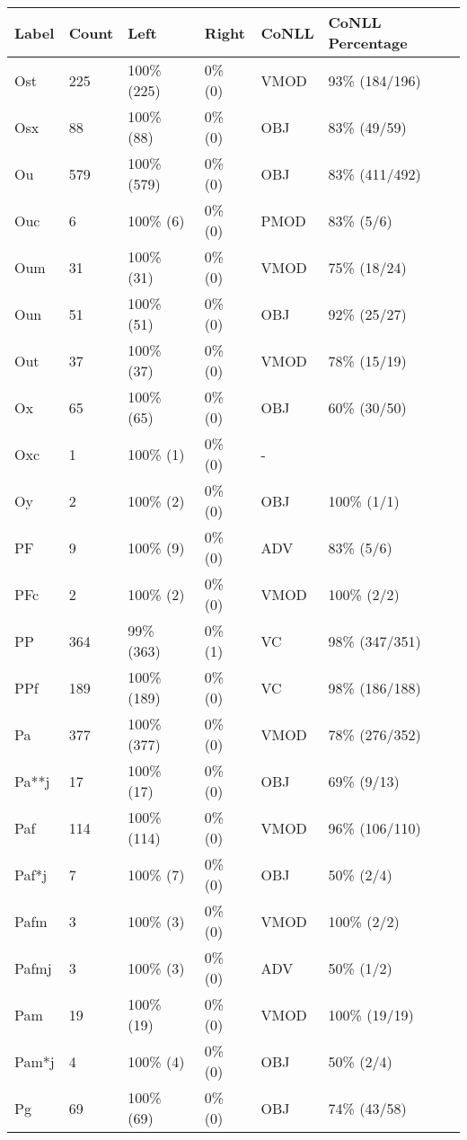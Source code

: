 \begin{figure*}
\begin{tabular}{|l|l|l|l||l|l|}
\hline
Label & Count & Left & Right & CoNLL & CoNLL Percentage\\ 
\hline
 Ost & 225 & 100\% (225) & 0\% (0) & VMOD & 93\% (184/196) \\ 
\hline
 Osx & 88 & 100\% (88) & 0\% (0) & OBJ & 83\% (49/59) \\ 
\hline
 Ou & 579 & 100\% (579) & 0\% (0) & OBJ & 83\% (411/492) \\ 
\hline
 Ouc & 6 & 100\% (6) & 0\% (0) & PMOD & 83\% (5/6) \\ 
\hline
 Oum & 31 & 100\% (31) & 0\% (0) & VMOD & 75\% (18/24) \\ 
\hline
 Oun & 51 & 100\% (51) & 0\% (0) & OBJ & 92\% (25/27) \\ 
\hline
 Out & 37 & 100\% (37) & 0\% (0) & VMOD & 78\% (15/19) \\ 
\hline
 Ox & 65 & 100\% (65) & 0\% (0) & OBJ & 60\% (30/50) \\ 
\hline
 Oxc & 1 & 100\% (1) & 0\% (0) & - &  \\ 
\hline
 Oy & 2 & 100\% (2) & 0\% (0) & OBJ & 100\% (1/1) \\ 
\hline
 PF & 9 & 100\% (9) & 0\% (0) & ADV & 83\% (5/6) \\ 
\hline
 PFc & 2 & 100\% (2) & 0\% (0) & VMOD & 100\% (2/2) \\ 
\hline
 PP & 364 & 99\% (363) & 0\% (1) & VC & 98\% (347/351) \\ 
\hline
 PPf & 189 & 100\% (189) & 0\% (0) & VC & 98\% (186/188) \\ 
\hline
 Pa & 377 & 100\% (377) & 0\% (0) & VMOD & 78\% (276/352) \\ 
\hline
 Pa**j & 17 & 100\% (17) & 0\% (0) & OBJ & 69\% (9/13) \\ 
\hline
 Paf & 114 & 100\% (114) & 0\% (0) & VMOD & 96\% (106/110) \\ 
\hline
 Paf*j & 7 & 100\% (7) & 0\% (0) & OBJ & 50\% (2/4) \\ 
\hline
 Pafm & 3 & 100\% (3) & 0\% (0) & VMOD & 100\% (2/2) \\ 
\hline
 Pafmj & 3 & 100\% (3) & 0\% (0) & ADV & 50\% (1/2) \\ 
\hline
 Pam & 19 & 100\% (19) & 0\% (0) & VMOD & 100\% (19/19) \\ 
\hline
 Pam*j & 4 & 100\% (4) & 0\% (0) & OBJ & 50\% (2/4) \\ 
\hline
 Pg & 69 & 100\% (69) & 0\% (0) & OBJ & 74\% (43/58) \\ 

\end{tabular}
\end{figure*}
